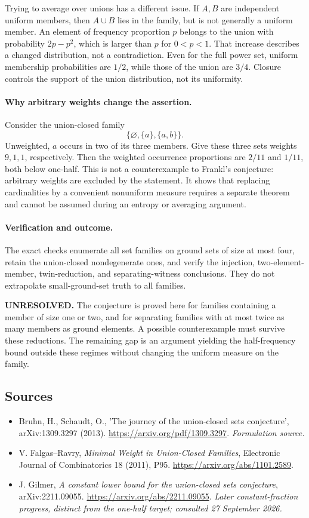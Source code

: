 \documentclass[11pt]{article}
\begin{document}
Trying to average over unions has a different issue. If $A,B$ are independent uniform members, then $A\cup B$ lies in the family, but is not generally a uniform member. An element of frequency proportion $p$ belongs to the union with probability $2p-p^2$, which is larger than $p$ for $0<p<1$. That increase describes a changed distribution, not a contradiction. Even for the full power set, uniform membership probabilities are $1/2$, while those of the union are $3/4$. Closure controls the support of the union distribution, not its uniformity.

\paragraph{Why arbitrary weights change the assertion.}
Consider the union-closed family
\[
 \{\varnothing,\{a\},\{a,b\}\}.
\]
Unweighted, $a$ occurs in two of its three members. Give these three sets weights $9,1,1$, respectively. Then the weighted occurrence proportions are $2/11$ and $1/11$, both below one-half. This is not a counterexample to Frankl's conjecture: arbitrary weights are excluded by the statement. It shows that replacing cardinalities by a convenient nonuniform measure requires a separate theorem and cannot be assumed during an entropy or averaging argument.

\paragraph{Verification and outcome.}
The exact checks enumerate all set families on ground sets of size at most four, retain the union-closed nondegenerate ones, and verify the injection, two-element-member, twin-reduction, and separating-witness conclusions. They do not extrapolate small-ground-set truth to all families.

\textbf{UNRESOLVED.} The conjecture is proved here for families containing a member of size one or two, and for separating families with at most twice as many members as ground elements. A possible counterexample must survive these reductions. The remaining gap is an argument yielding the half-frequency bound outside these regimes without changing the uniform measure on the family.

\subsection{Sources}
\begin{itemize}
\item[S1]Bruhn, H., Schaudt, O., 'The journey of the union-closed sets conjecture', arXiv:1309.3297 (2013).
\url{https://arxiv.org/pdf/1309.3297}.
\textit{Formulation source.}
\item[E1]V. Falgas--Ravry, \emph{Minimal Weight in Union-Closed Families}, Electronic Journal of Combinatorics 18 (2011), P95.
\url{https://arxiv.org/abs/1101.2589}.
\item[E2]J. Gilmer, \emph{A constant lower bound for the union-closed sets conjecture}, arXiv:2211.09055.
\url{https://arxiv.org/abs/2211.09055}.
\textit{Later constant-fraction progress, distinct from the one-half target; consulted 27 September 2026.}
\end{itemize}
\end{document}
